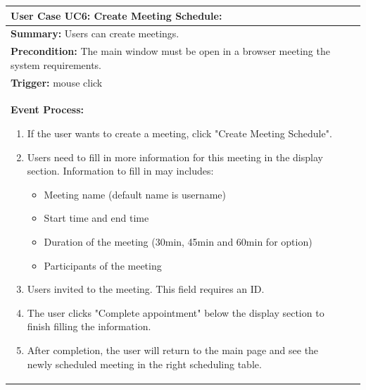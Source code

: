 \documentclass{article}
\begin{document}
  \begin{tabularx}{0.9\textwidth} { 
    | >{\raggedright\arraybackslash}X 
    | >{\centering\arraybackslash}X | }
   \hline
   \textbf{User Case UC6: Create Meeting Schedule:} \\
   \hline
   \textbf{Summary:} Users can create meetings.\\
   \hline
   \textbf{Precondition:} The main window must be open in a browser meeting the system requirements.\\
   \hline
   \textbf{Trigger:} mouse click\\
   \hline
   \textbf{Event Process:}
   \begin{enumerate}
    \item If the user wants to create a meeting, click "Create Meeting Schedule".
    \item Users need to fill in more information for this meeting in the display section. Information to fill in may includes:
    \begin{itemize}
        \item Meeting name (default name is username)
        \item Start time and end time
        \item Duration of the meeting (30min, 45min and 60min for option)
        \item Participants of the meeting
    \end{itemize}
    \item Users invited to the meeting. This field requires an ID.
    \item The user clicks "Complete appointment" below the display section to finish filling the information.
    \item After completion, the user will return to the main page and see the newly scheduled meeting in the right scheduling table.
   \end{enumerate}\\
   \hline
  \end{tabularx}
\end{document}
